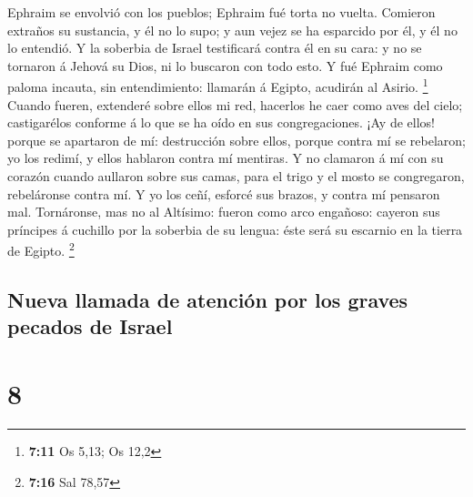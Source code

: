  Ephraim se envolvió con los pueblos; Ephraim fué torta no
vuelta.  Comieron extraños su sustancia, y él no lo supo;
y aun vejez se ha esparcido por él, y él no lo entendió. 
Y la soberbia de Israel testificará contra él en su cara: y no se
tornaron á Jehová su Dios, ni lo buscaron con todo esto. 
Y fué Ephraim como paloma incauta, sin entendimiento: llamarán á Egipto,
acudirán al Asirio. \footnote{\textbf{7:11} Os 5,13; Os 12,2}
 Cuando fueren, extenderé sobre ellos mi red, hacerlos he
caer como aves del cielo; castigarélos conforme á lo que se ha oído en
sus congregaciones.  ¡Ay de ellos! porque se apartaron de
mí: destrucción sobre ellos, porque contra mí se rebelaron; yo los
redimí, y ellos hablaron contra mí mentiras.  Y no
clamaron á mí con su corazón cuando aullaron sobre sus camas, para el
trigo y el mosto se congregaron, rebeláronse contra mí. 
Y yo los ceñí, esforcé sus brazos, y contra mí pensaron mal.
 Tornáronse, mas no al Altísimo: fueron como arco
engañoso: cayeron sus príncipes á cuchillo por la soberbia de su lengua:
éste será su escarnio en la tierra de Egipto. \footnote{\textbf{7:16}
  Sal 78,57}

\hypertarget{nueva-llamada-de-atenciuxf3n-por-los-graves-pecados-de-israel}{%
\subsection{Nueva llamada de atención por los graves pecados de
Israel}\label{nueva-llamada-de-atenciuxf3n-por-los-graves-pecados-de-israel}}

\hypertarget{section-7}{%
\section{8}\label{section-7}}

